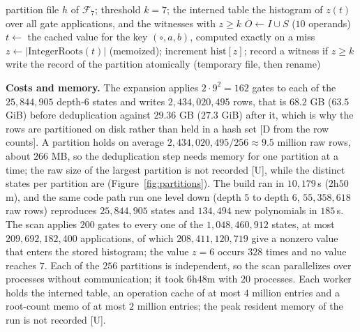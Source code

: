 \documentclass[11pt]{article}
\theoremstyle{definition}
\theoremstyle{remark}
\begin{document}
\begin{algorithm}[t]
\caption{Exhaustive last-gate scan of a stored frontier (one worker, one partition).}
\label{alg:scan}
\begin{algorithmic}[1]
\Require partition file $h$ of $\mathcal{F}_7$; threshold $k = 7$; the interned table
\Ensure the histogram of $z(t)$ over all gate applications, and the witnesses with $z \ge k$
  \State $O \gets I \cup S$ ($10$ operands)
    \State $t \gets$ the cached value for the key $(\circ, a, b)$, computed exactly on a miss
     $z \gets |\mathrm{IntegerRoots}(t)|$ (memoized); increment $\mathrm{hist}[z]$; record a witness if $z \ge k$ \EndIf
  \EndFor
\EndFor
\State write the record of the partition atomically (temporary file, then rename)
\end{algorithmic}
\end{algorithm}

\textbf{Costs and memory.} The expansion applies $2 \cdot 9^2 = 162$ gates to each of the
$25{,}844{,}905$ depth-$6$ states and writes $2{,}434{,}020{,}495$ rows, that is
$68.2$ GB ($63.5$ GiB) before deduplication against $29.36$ GB ($27.3$ GiB) after
it, which is why the rows are partitioned on disk rather than held in a hash set [D from the
row counts]. A partition holds on average $2{,}434{,}020{,}495/256 \approx 9.5$ million raw
rows, about $266$ MB, so the deduplication step needs memory for one partition at a time; the
raw size of the largest partition is not recorded [U], while the distinct states per partition are
(Figure~\ref{fig:partitions}). The build ran in $10{,}179$\,s ($2$h$50$m), and the same
code path run one level down (depth $5$ to depth $6$, $55{,}358{,}618$ raw rows) reproduces
$25{,}844{,}905$ states and $134{,}494$ new polynomials in $185$\,s. The scan applies
$200$ gates to every one of the $1{,}048{,}460{,}912$ states, at most $209{,}692{,}182{,}400$
applications, of which $208{,}411{,}120{,}719$ give a nonzero value that enters the stored
histogram; the value $z = 6$ occurs $328$ times and no value reaches $7$. Each of the $256$
partitions is independent, so the scan parallelizes over processes without communication;
it took $6$h$48$m with $20$ processes. Each worker holds the interned table, an operation
cache of at most $4$ million entries and a root-count memo of at most $2$ million entries;
the peak resident memory of the run is not recorded [U].
\end{document}
